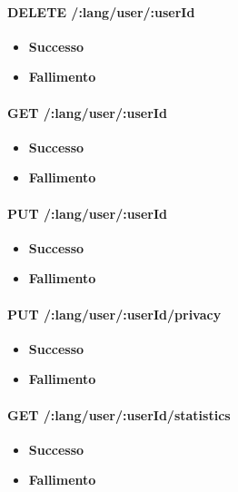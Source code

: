 
\paragraph{DELETE /:lang/user/:userId}
\begin{itemize}
\item \textbf{Successo}
\item \textbf{Fallimento}
\end{itemize}

\paragraph{GET /:lang/user/:userId}
\begin{itemize}
\item \textbf{Successo}
\item \textbf{Fallimento}
\end{itemize}

\paragraph{PUT /:lang/user/:userId}
\begin{itemize}
\item \textbf{Successo}
\item \textbf{Fallimento}
\end{itemize}

\paragraph{PUT /:lang/user/:userId/privacy}
\begin{itemize}
\item \textbf{Successo}
\item \textbf{Fallimento}
\end{itemize}


\paragraph{GET /:lang/user/:userId/statistics}
\begin{itemize}
\item \textbf{Successo}
\item \textbf{Fallimento}
\end{itemize}

